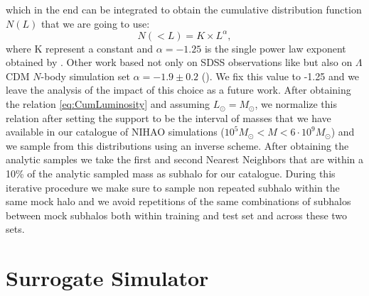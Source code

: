 which in the end can be integrated to obtain the cumulative distribution function $N(L)$ that we are going to use:
\begin{equation}
    N(<L) = K \times L^{\alpha},
\label{eq:CumLuminosity}
\end{equation}
where K represent a constant and $\alpha=-1.25$ is the single power law exponent obtained by \cite{koposovLuminosityFunctionMilky2008}. Other work based not only on SDSS observations like \cite{koposovLuminosityFunctionMilky2008} but also on $\Lambda$CDM $N$-body simulation set $\alpha = -1.9 \pm 0.2$ (\cite{tollerudHundredsMilkyWay2008}). We fix this value to -1.25 and we leave the analysis of the impact of this choice as a future work.
After obtaining the relation \ref{eq:CumLuminosity} and assuming $L_\odot = M_\odot$, we normalize this relation after setting the support to be the interval of masses that we have available in our catalogue of NIHAO simulations ($10^5 M_\odot < M < 6 \cdot 10^9 M_\odot$) and we sample from this distributions using an inverse scheme. After obtaining the analytic samples we take the first and second Nearest Neighbors that are within a  
10\% of the analytic sampled mass as subhalo for our catalogue. During this iterative procedure we make sure to sample non repeated subhalo within the same mock halo and we avoid repetitions of the same combinations of subhalos between mock subhalos both within training and test set and across these two sets.   
\section{Surrogate Simulator}
